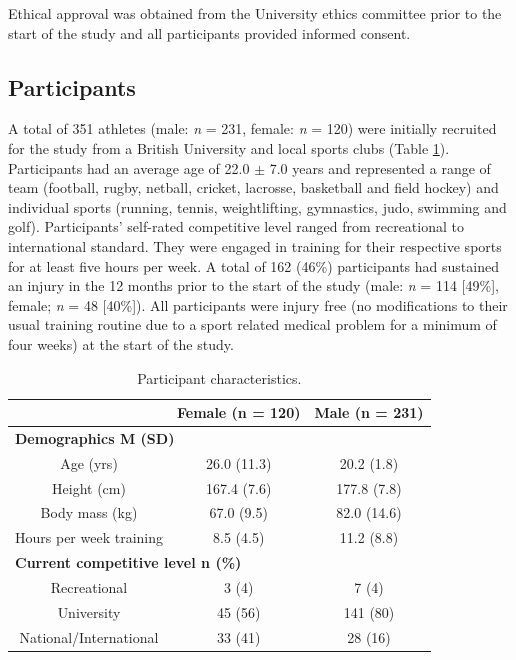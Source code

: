 \documentclass[
  english,
  man]{apa6}
\begin{document}
Ethical approval was obtained from the University ethics committee prior to the start of the study and all participants provided informed consent.

\hypertarget{participants}{%
\subsection{Participants}\label{participants}}

A total of 351 athletes (male: \emph{n} = 231, female: \emph{n} = 120) were initially recruited for the study from a British University and local sports clubs (Table \ref{tab:table1}).
Participants had an average age of 22.0 \(\pm\) 7.0 years and represented a range of team (football, rugby, netball, cricket, lacrosse, basketball and field hockey) and individual sports (running, tennis, weightlifting, gymnastics, judo, swimming and golf).
Participants' self-rated competitive level ranged from recreational to international standard.
They were engaged in training for their respective sports for at least five hours per week.
A total of 162 (46\%) participants had sustained an injury in the 12 months prior to the start of the study (male: \emph{n} = 114 {[}49\%{]}, female; \emph{n} = 48 {[}40\%{]}).
All participants were injury free (no modifications to their usual training routine due to a sport related medical problem for a minimum of four weeks) at the start of the study.

\begin{table}[H]

\caption{\label{tab:table1}Participant characteristics.}
\centering
\begin{tabular}[t]{c|c|c}
\hline
\textbf{ } & \textbf{Female (n = 120)} & \textbf{Male (n = 231)}\\
\hline
\multicolumn{3}{l}{\textbf{Demographics M (SD)}}\\
\hline
\hspace{1em}Age (yrs) & 26.0 (11.3) & 20.2 (1.8)\\
\hline
\hspace{1em}Height (cm) & 167.4 (7.6) & 177.8 (7.8)\\
\hline
\hspace{1em}Body mass (kg) & 67.0 (9.5) & 82.0 (14.6)\\
\hline
\hspace{1em}Hours per week training & 8.5 (4.5) & 11.2 (8.8)\\
\hline
\multicolumn{3}{l}{\textbf{Current competitive level n (\%)}}\\
\hline
\hspace{1em}Recreational & 3 (4) & 7 (4)\\
\hline
\hspace{1em}University & 45 (56) & 141 (80)\\
\hline
\hspace{1em}National/International & 33 (41) & 28 (16)\\
\hline
\end{tabular}
\end{table}
\end{document}

